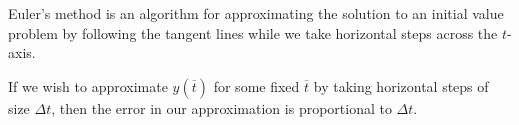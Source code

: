 \begin{summary}
\item Euler's method is an algorithm for approximating the solution to
  an initial value problem by following the tangent lines while we
  take horizontal steps across the $t$-axis.
\item If we wish to approximate $y(\overline{t})$ for some fixed
  $\overline{t}$ by taking horizontal steps of size $\Delta t$, then the
  error in our approximation is proportional to $\Delta t$.  
\end{summary}

\nin \hrulefill

 



\clearpage
